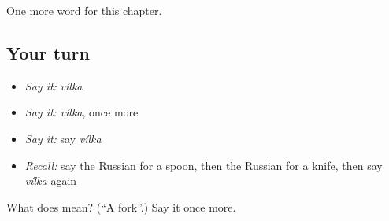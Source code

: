 \begin{grammarlens}[title={What you've built}]
One more word for this chapter.
\end{grammarlens}

\subsection*{Your turn}
\begin{itemize}
\raggedright
  \item \emph{Say it:} \emph{vílka}
  \item \emph{Say it:} \emph{vílka}, once more
  \item \emph{Say it:} say \emph{vílka}
  \item \emph{Recall:} say the Russian for a spoon, then the Russian for a knife, then say \emph{vílka} again
\end{itemize}

\begin{tcolorbox}[breakable,colback=teal!4,colframe=teal!35!black,title={Before you move on}]
What does  mean? (\textquotedblleft{}A fork\textquotedblright{}.) Say it once more.
\end{tcolorbox}
